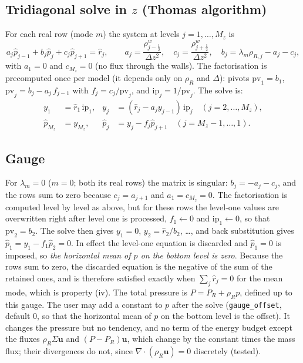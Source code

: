 \documentclass[11pt,a4paper]{article}
\newcommand{\code}[1]{\texttt{#1}}
\begin{document}
\subsection{Tridiagonal solve in $z$ (Thomas algorithm)}
For each real row (mode $m$) the system at levels $j=1,\dots,M_z$ is
\begin{equation}
  a_j\hat p_{j-1}+b_j\hat p_j+c_j\hat p_{j+1}=\hat r_j,\qquad
  a_j=\frac{\rho^w_{j-\frac12}}{\Delta z^2},\quad c_j=\frac{\rho^w_{j+\frac12}}{\Delta z^2},\quad b_j=\lambda_m\rho_{R,j}-a_j-c_j,
\end{equation}
with $a_1=0$ and $c_{M_z}=0$ (no flux through the walls). The factorisation is precomputed once per model (it depends only on $\rho_R$ and $\Delta$): pivots $\mathrm{pv}_1=b_1$, $\mathrm{pv}_j=b_j-a_j\,f_{j-1}$ with $f_j=c_j/\mathrm{pv}_j$, and $\mathrm{ip}_j=1/\mathrm{pv}_j$. The solve is:
\begin{align}
  y_1&=\hat r_1\,\mathrm{ip}_1, & y_j&=(\hat r_j-a_jy_{j-1})\,\mathrm{ip}_j\quad(j=2,\dots,M_z),\\
  \hat p_{M_z}&=y_{M_z}, & \hat p_j&=y_j-f_j\hat p_{j+1}\quad(j=M_z-1,\dots,1).
\end{align}

\subsection{Gauge}
For $\lambda_m=0$ ($m=0$; both its real rows) the matrix is singular: $b_j=-a_j-c_j$, and the rows sum to zero because $c_j=a_{j+1}$ and $a_1=c_{M_z}=0$.
The factorisation is computed level by level as above, but for these rows the level-one values are overwritten right after level one is processed, $f_1\leftarrow0$ and $\mathrm{ip}_1\leftarrow0$, so that $\mathrm{pv}_2=b_2$. The solve then gives $y_1=0$, $y_2=\hat r_2/b_2$, \dots, and back substitution gives
$\hat p_1=y_1-f_1\hat p_2=0$. In effect the level-one equation is discarded and $\hat p_1=0$ is imposed, so \emph{the horizontal mean of $p$ on the bottom level is zero}. Because the rows sum to zero, the discarded equation is the negative of the sum of the retained ones,
and is therefore satisfied exactly when $\sum_j\hat r_j=0$ for the mean mode, which is property (iv). The total pressure is $P=P_R+\rho_Rp$, defined up to this gauge. The user may add a constant to $p$ after the solve (\code{gauge\_offset}, default $0$, so that the horizontal mean of $p$ on the bottom level is the offset). It changes the pressure but no tendency, and no term of the energy budget except the fluxes $\rho_R\Sigma\mathbf u$ and $(P-P_R)\mathbf u$, which change by the constant times the mass flux; their divergences do not, since $\nabla\!\cdot(\rho_R\mathbf u)=0$ discretely (tested).
\end{document}
